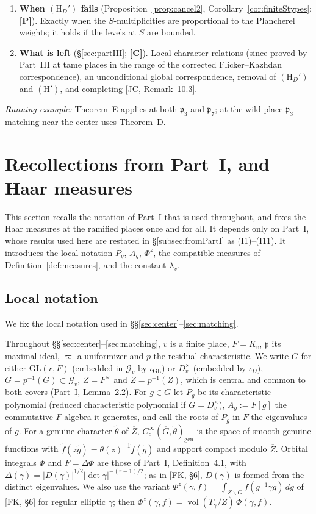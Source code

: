 \documentclass[12pt]{article}
\newcommand{\ov}[1]{\overline{#1}}
\newcommand{\fp}{\mathfrak{p}}
\newcommand{\gen}{\mathrm{gen}}
\newcommand{\vol}{\operatorname{vol}}
\newcommand{\GL}{\mathrm{GL}}
\newcommand{\Gb}{\ov{G}}
\newcommand{\Zb}{\ov{Z}}
\newcommand{\cG}{\mathcal{G}}
\newcommand{\cGb}{\ov{\mathcal{G}}}
\newcommand{\iD}{\iota_D}
\newcommand{\iG}{\iota_{\GL}}
\newcommand{\Pv}{\textbf{[P]}}
\newcommand{\Cv}{\textbf{[C]}}
\theoremstyle{plain}
\theoremstyle{definition}
\begin{document}
\begin{enumerate}[leftmargin=*,label=\arabic*.]
\item \textbf{When $(\mathrm H_D')$ fails} (Proposition~\ref{prop:cancel2}, Corollary~\ref{cor:finiteStypes}; \Pv). Exactly when the $S$-multiplicities are proportional to the Plancherel weights; it holds if the levels at $S$ are bounded.
\item \textbf{What is left} (\S\ref{sec:partIII}; \Cv). Local character relations (since proved by Part~III at tame places in the range of the corrected Flicker--Kazhdan correspondence), an unconditional global correspondence, removal of $(\mathrm H_D')$ and $(\mathrm H')$, and completing [JC, Remark~10.3].
\end{enumerate}
\emph{Running example:} Theorem~E applies at both $\mathfrak p_3$ and $\mathfrak p_7$; at the wild place $\mathfrak p_3$ matching near the center uses Theorem~D.

\section{Recollections from Part~I, and Haar measures}\label{sec:recall}
This section recalls the notation of Part~I that is used throughout, and fixes the Haar measures at the ramified places once and for all. It depends only on Part~I, whose results used here are restated in \S\ref{subsec:fromPartI} as (I1)--(I11). It introduces the local notation $P_g$, $A_g$, $\Phi^z$, the compatible measures of Definition~\ref{def:measures}, and the constant $\lambda_v$.

\subsection{Local notation}\label{subsec:localnotation}
We fix the local notation used in \S\S\ref{sec:center}--\ref{sec:matching}.

Throughout \S\S\ref{sec:center}--\ref{sec:matching}, $v$ is a finite place, $F=K_v$, $\fp$ its maximal ideal, $\varpi$ a uniformizer and $p$ the residual characteristic. We write $G$ for either $\GL(r,F)$ (embedded in $\cG_v$ by $\iG$) or $D_v^\times$ (embedded by $\iD$), $\Gb=p^{-1}(G)\subset\cGb_v$, $Z=F^\times$ and $\Zb=p^{-1}(Z)$, which is central and common to both covers (Part~I, Lemma~2.2). For $g\in G$ let $P_g$ be its characteristic polynomial (reduced characteristic polynomial if $G=D_v^\times$), $A_g:=F[g]$ the commutative $F$-algebra it generates, and call the roots of $P_g$ in $\ov F$ the eigenvalues of $g$. For a genuine character $\tilde\theta$ of $\Zb$, $C_c^\infty(\Gb,\tilde\theta)_\gen$ is the space of smooth genuine functions with $\tilde f(z\tilde g)=\tilde\theta(z)^{-1}\tilde f(\tilde g)$ and support compact modulo $\Zb$. Orbital integrals $\Phi$ and $F=\Delta\Phi$ are those of Part~I, Definition~4.1, with $\Delta(\gamma)=|D(\gamma)|^{1/2}|\det\gamma|^{-(r-1)/2}$; as in [FK, \S6], $D(\gamma)$ is formed from the distinct eigenvalues. We also use the variant $\Phi^z(\gamma,f)=\int_{Z\backslash G}f(g^{-1}\gamma g)\,dg$ of [FK, \S6] for regular elliptic $\gamma$; then $\Phi^z(\gamma,f)=\vol(T_\gamma/Z)\,\Phi(\gamma,f)$.
\end{document}

